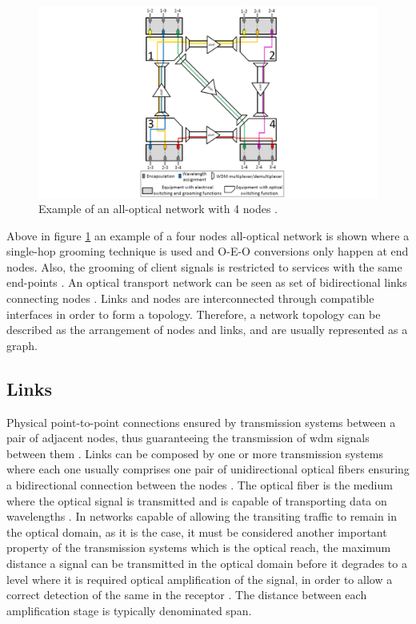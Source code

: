 \begin{figure}[H]
  \begin{center}
    \includegraphics[width=1\textwidth]{fig/logos/transparentNode.pdf}
    \caption{Example of an all-optical network with 4 nodes \cite{RuiMoraisPhD}.}
  \end{center}
  \label{exampleTransparentNetwork}
\end{figure}

Above in figure \ref{exampleTransparentNetwork} an example of a four nodes all-optical network is shown where a single-hop grooming technique is used and O-E-O conversions only happen at end nodes. Also, the grooming of client signals is restricted to services with the same end-points \cite{RuiMoraisPhD}. 
\clearpage 
An optical transport network can be seen as set of bidirectional links connecting nodes \cite{RuiMoraisPhD}. Links and nodes are interconnected through compatible interfaces in order to form a topology. Therefore, a network topology can be described as the arrangement of nodes and links, and are usually represented as a graph. 

\subsection{Links}
Physical point-to-point connections ensured by transmission systems between a pair of adjacent nodes, thus guaranteeing the transmission of \gls{wdm} signals between them \cite{TiagoEsteves}. Links can be composed by one or more transmission systems where each one usually comprises one pair of unidirectional optical fibers ensuring a bidirectional connection between the nodes \cite{RuiMoraisPhD}. The optical fiber is the medium where the optical signal is transmitted and is capable of transporting data on wavelengths \cite{ramaswami}. In networks capable of allowing the transiting traffic to remain in the optical domain, as it is the case, it must be considered another important property of the transmission systems which is the optical reach, the maximum distance a signal can be transmitted in the optical domain before it degrades to a level where it is required optical amplification of the signal, in order to allow a correct detection of the same in the receptor \cite{SimmonsJane2008}. The distance between each amplification stage is typically denominated span.

